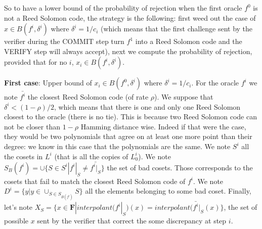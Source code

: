\documentclass[12pt]{extarticle}
\newcommand{\<}{\langle}
\renewcommand{\>}{\rangle}
\theoremstyle{definition}
\begin{document}
So to have a lower bound of the probability of rejection when the first oracle $f^0$ is not a Reed Solomon code, the strategy is the following: first weed out the case of $x\in B(f^i,\delta^i)$ where $\delta^i=1/c_i$ (which means that the first challenge sent by the verifier during the COMMIT step turn $f^1$ into a Reed Solomon code and the VERIFY step will always accept), next we compute the probability of rejection, provided that for no $i$, $x_i\in B(f^i,\delta^i)$.

\textbf{First case}: Upper bound of $x_i\in B(f^0,\delta^i)$ where $\delta^i=1/c_i$. For the oracle $f^i$ we note $\bar{f^i}$ the closest Reed Solomon code (of rate $\rho$). We suppose that $\delta^i<(1-\rho)/2$, which means that there is one and only one Reed Solomon closest to the oracle (there is no tie). This is because two Reed Solomon code can not be closer than $1-\rho$ Hamming distance wise. Indeed if that were the case, they would be two polynomials that agree on at least one more point than their degree: we know in this case that the polynomials are the same. We note $S^i$ all the cosets in $L^i$ (that is all the copies of $L^i_0$). We note $S_B(f^i)=\cup\{S\in S^i|f^i|_S\neq\bar{f^i|_S}\}$ the set of bad cosets. Those corresponds to the cosets that fail to match the closest Reed Solomon code of $f^i$. We note $D^i=\{y|y\in\cup_{S\in S_{B(f^i)}}S\}$ all the elements belonging to some bad coset. Finally, let's note $X_S=\{x\in\mathbf{F}|interpolant(f^i|_S)(x)=interpolant(\bar{f^i}|_S(x)\}$, the set of possible $x$ sent by the verifier that correct the some discrepancy at step $i$.
\end{document}
